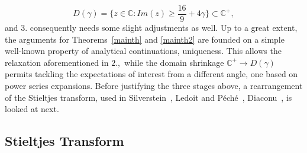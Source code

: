 \documentclass{article}
\numberwithin{equation}{section}
\begin{document}
\begin{equation}\label{dgamma}
    D(\gamma)=\{z \in \mathbb{C}: Im(z) \geq \frac{16}{9}+4\gamma\} \subset \mathbb{C}^{+},
\end{equation}
and \(3.\) consequently needs some slight adjustments as well. Up to a great extent, the arguments for Theorems~\ref{mainth} and \ref{mainth2} are founded on a simple well-known property of analytical continuations, %
uniqueness. This allows the relaxation aforementioned in \(2.,\) while the domain shrinkage \(\mathbb{C}^{+} \to D(\gamma)\) permits tackling the expectations of interest from a different angle, one based on power series expansions. Before justifying the three stages above, a rearrangement of the Stieltjes transform, used in Silverstein~\cite{silv1}, Ledoit and Péché~\cite{ledoitpeche}, Diaconu~\cite{oldpaper},
is looked at next.

\subsection*{Stieltjes Transform}
\end{document}
